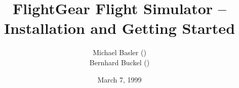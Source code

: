 
\title{FlightGear Flight Simulator -- Installation and Getting Started}

\author{
 Michael Basler ()\\
 Bernhard Buckel
 ()\\
{ \setlength{\fboxsep}{12mm}\setlength{\fboxrule}{0pt}
 }}

\date{March 7, 1999}

\maketitle


\tableofcontents


